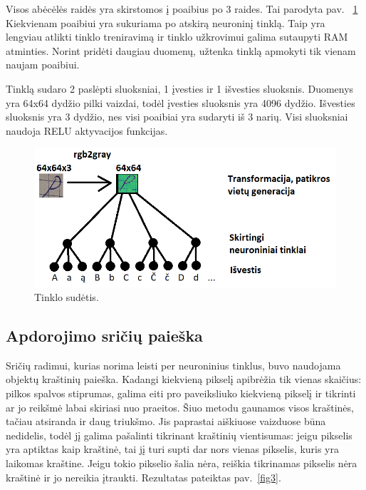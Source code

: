 \documentclass[conference]{IEEEtran}
\begin{document}
Visos abėcėlės raidės yra skirstomos į poaibius po 3 raides. Tai parodyta pav. ~\ref{fig1} Kiekvienam poaibiui yra
sukuriama po atskirą neuroninį tinklą. Taip yra lengviau atlikti tinklo treniravimą
ir tinklo užkrovimui galima sutaupyti RAM atminties. Norint pridėti daugiau
duomenų, užtenka tinklą apmokyti tik vienam naujam poaibiui.
\par
Tinklą sudaro 2 paslėpti sluoksniai, 1 įvesties ir 1 išvesties sluoksnis. Duomenys
yra 64x64 dydžio pilki vaizdai, todėl įvesties sluoksnis yra 4096 dydžio. Išvesties
sluoksnis yra 3 dydžio, nes visi poaibiai yra sudaryti iš 3 narių. Visi sluoksniai naudoja
RELU aktyvacijos funkcijas.

\begin{figure}[!h] %
\centerline{\includegraphics[scale=0.4] {images/1.png}}
\caption{Tinklo sudėtis.}
\label{fig1}
\end{figure}

\subsection{Apdorojimo sričių paieška}


Sričių radimui, kurias norima leisti per neuroninius tinklus, buvo naudojama
objektų kraštinių paieška. Kadangi kiekvieną pikselį apibrėžia tik vienas skaičius:
pilkos spalvos stiprumas, galima eiti pro paveiksliuko kiekvieną pikselį ir
tikrinti ar jo reikšmė labai skiriasi nuo praeitos. Šiuo metodu gaunamos visos kraštinės,
tačiau atsiranda ir daug triukšmo. Jis paprastai aiškiuose vaizduose būna nedidelis, todėl
jį galima pašalinti tikrinant kraštinių vientisumas: jeigu pikselis yra aptiktas kaip kraštinė,
tai jį turi supti dar nors vienas pikselis, kuris yra laikomas kraštine. Jeigu tokio pikselio šalia nėra,
reiškia tikrinamas pikselis nėra kraštinė ir jo nereikia įtraukti. Rezultatas pateiktas pav.~\ref{fig3}.
\end{document}
